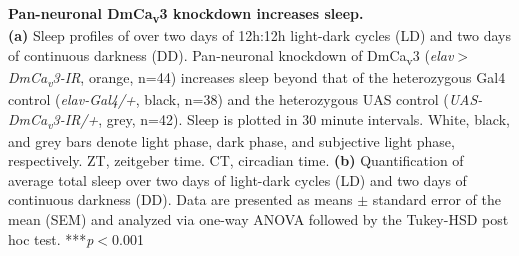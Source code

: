 \label{fig:5}
\textbf{Pan-neuronal DmCa\textsubscript{v}3 knockdown increases sleep.}
\\
\textbf{(a)} Sleep profiles of over two days of 12h:12h light-dark cycles (LD) and two days of continuous darkness (DD). Pan-neuronal knockdown of DmCa\textsubscript{v}3 (\emph{elav$>$DmCa\textsubscript{v}3-IR}, orange, n=44) increases sleep beyond that of the heterozygous Gal4 control (\emph{elav-Gal4/+}, black, n=38) and the heterozygous UAS control (\emph{UAS-DmCa\textsubscript{v}3-IR/+}, grey, n=42).
Sleep is plotted in 30 minute intervals.
White, black, and grey bars denote light phase, dark phase, and subjective light phase, respectively.
ZT, zeitgeber time.
CT, circadian time.
\textbf{(b)} Quantification of average total sleep over two days of light-dark cycles (LD) and two days of continuous darkness (DD).
Data are presented as means $\pm$ standard error of the mean (SEM) and analyzed via one-way ANOVA followed by the Tukey-HSD post hoc test.
***\emph{p}$<$0.001

  